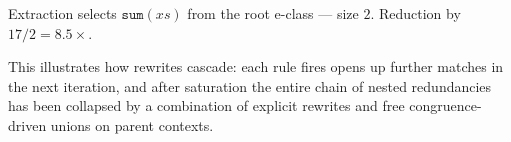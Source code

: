 \documentclass[11pt,a4paper]{article}
\begin{document}
Extraction selects $\mathtt{sum}(xs)$ from the root e-class --- size $2$. Reduction by $17 / 2 = 8.5\times$.

This illustrates how rewrites cascade: each rule fires opens up further matches in the next iteration, and after saturation the entire chain of nested redundancies has been collapsed by a combination of explicit rewrites and free congruence-driven unions on parent contexts.



\end{document}
